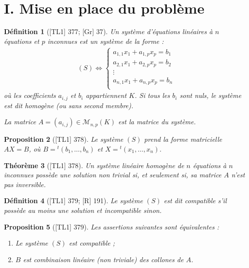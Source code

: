 \documentclass[10pt, a4paper, parskip=full, twoside, twocolumn]{report}
\newtheorem{definition}{Définition}
\newtheorem{theorem}[definition]{Théorème}
\newtheorem{proposition}[definition]{Proposition}
\newcommand{\M}{\mathcal{M}}
\begin{document}
\section*{I. Mise en place du problème}
\begin{definition}[\textnormal{[TL1] 377; [Gr] 37}]
	Un système d'équations linéaires à $n$ équations et $p$ inconnues est un système de la forme :
	\begin{align*}
		(S) \iff \begin{cases}
			a_{1,1}x_1 + a_{1,p}x_p = b_1 \\
			a_{2,1}x_1 + a_{2,p}x_p = b_2 \\
			\vdots \\
			a_{n,1}x_1 + a_{n,p}x_p = b_n \\
		\end{cases}
	\end{align*}
	où les coefficients $a_{i,j}$ et $b_i$ appartiennent $K$.
	Si tous les $b_i$ sont nuls, le système est dit \emph{homogène} (ou sans second membre).

	La matrice $A = \left(a_{i,j}\right)\in\M_{n,p}(K)$ est la matrice du système.
\end{definition}

\begin{proposition}[\textnormal{[TL1] 378}]
	Le système $(S)$ prend la forme matricielle $AX = B$, où $B = {}^t(b_1,\dots,b_n)$ et $X = {}^t(x_1,\dots, x_n)$.
\end{proposition}

\begin{theorem}[\textnormal{[TL1] 378}]
	Un système linéaire homogène de $n$ équations à $n$ inconnues possède une solution non trivial si, et seulement si, sa matrice $A$ n'est pas inversible.
\end{theorem}

\begin{definition}[\textnormal{[TL1] 379; [R] 191}]
	Le système $(S)$ est dit \emph{compatible} s'il possède au moins une solution et \emph{incompatible} sinon.
\end{definition}

\begin{proposition}[\textnormal{[TL1] 379}]
	Les assertions suivantes sont équivalentes :
	\begin{enumerate}
		\item Le système $(S)$ est compatible ;
		\item $B$ est combinaison linéaire (non triviale) des collones de $A$.
	\end{enumerate}
\end{proposition}
\end{document}
